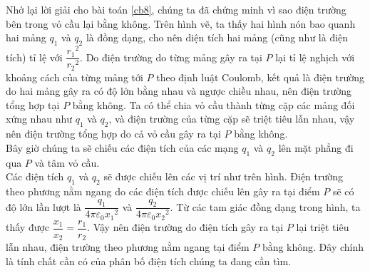 \begin{loigiai}
\begin{center}

    \end{center}
        Nhớ lại lời giải cho bài toán \ref{cb8}, chúng ta đã chứng minh vì sao điện trường bên trong vỏ cầu lại bằng không. Trên hình vẽ, ta thấy hai hình nón bao quanh hai mảng $q_1$ và $q_2$ là đồng dạng, cho nên diện tích hai mảng (cũng như là điện tích) tỉ lệ với $\dfrac{{r_1}^2}{{r_2}^2}$. Do điện trường do từng mảng gây ra tại $P$ lại tỉ lệ nghịch với khoảng cách của từng mảng tới $P$ theo định luật Coulomb, kết quả là điện trường do hai mảng gây ra có độ lớn bằng nhau và ngược chiều nhau, nên điện trường tổng hợp tại $P$ bằng không. Ta có thể chia vỏ cầu thành từng cặp các mảng đối xứng nhau như $q_1$ và $q_2$, và điện trường của từng cặp sẽ triệt tiêu lẫn nhau, vậy nên điện trường tổng hợp do cả vỏ cầu gây ra tại $P$ bằng không.\\
        Bây giờ chúng ta sẽ chiếu các điện tích của các mạng $q_1$ và $q_2$ lên mặt phẳng đi qua $P$ và tâm vỏ cầu.\\
        Các điện tích $q_1$ và $q_2$ sẽ được chiếu lên các vị trí như trên hình. Điện trường theo phương nằm ngang do các điện tích được chiếu lên gây ra tại điểm $P$ sẽ có độ lớn lần lượt là $\dfrac{q_1}{4\pi\varepsilon_0 {x_1}^2}$ và $\dfrac{q_2}{4\pi\varepsilon_0 {x_2}^2}$. Từ các tam giác đồng dạng trong hình, ta thấy được $\dfrac{x_1}{x_2}=\dfrac{r_1}{r_2}$. Vậy nên điện trường do điện tích gây ra tại $P$ lại triệt tiêu lẫn nhau, điện trường theo phương nằm ngang tại điểm $P$ bằng không. Đây chính là tính chất cần có của phân bố điện tích chúng ta đang cần tìm.
        \begin{center}
            


\begin{tikzpicture}[x=0.75pt,y=0.75pt,yscale=-1,xscale=1]


\end{tikzpicture}
\end{center}
\end{loigiai}
